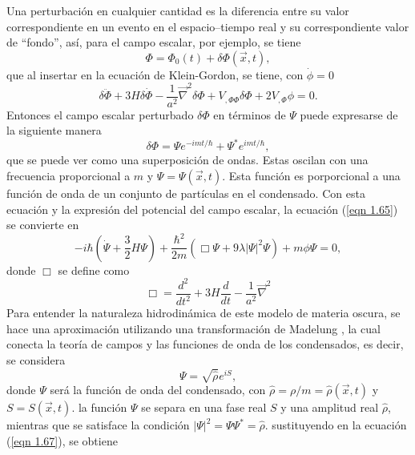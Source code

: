 \documentclass[a4paper,openright,12pt]{book}
\begin{document}
Una perturbación en cualquier cantidad es la diferencia entre su valor correspondiente en un evento en el espacio--tiempo real y su correspondiente valor de ``fondo'', así, para el campo escalar, por ejemplo, se tiene
\begin{equation}
\Phi = \Phi_{0}(t) + \delta\Phi(\vec{x},t),\label{eqn 1.64}
\end{equation}
que al insertar en la ecuación de Klein-Gordon, se tiene, con $\dot{\phi}=0$
\begin{equation}
\delta\ddot{\Phi} + 3H\delta\dot{\Phi}
- \frac{1}{a^{2}}\vec{\nabla}^{2}\delta\Phi
+V_{,\Phi\Phi}\delta\Phi +2V_{,\Phi}\phi = 0.\label{eqn 1.65}
\end{equation}
Entonces el campo escalar perturbado $\delta\Phi$ en términos de $\Psi$ puede expresarse de la siguiente manera
\begin{equation}
\delta\Phi = \Psi e^{-imt/\hbar} +\Psi^{*}e^{imt/\hbar},\label{eqn 1.66}
\end{equation}
que se puede ver como una superposición de ondas. Estas oscilan con una frecuencia proporcional a $m$ y $\Psi = \Psi(\vec{x},t)$. Esta función es porporcional a una función de onda de un conjunto de partículas en el condensado. Con esta ecuación y la expresión del potencial del campo escalar, la ecuación (\ref{eqn 1.65}) se convierte en 
\begin{equation}
-i\hbar(\dot{\Psi}+\frac{3}{2}H\Psi) + \frac{\hbar^{2}}{2m}(\Box \Psi +9\lambda|\Psi|^{2}\Psi) + m\phi\Psi = 0,\label{eqn 1.67}
\end{equation}
donde $\Box$ se define como 
\begin{equation}
\Box = \frac{d^{2}}{d t^{2}} + 3H\frac{d}{d t} - \frac{1}{a^{2}}\vec{\nabla}^{2}\label{eqn 1.68}
\end{equation}
Para entender la naturaleza hidrodinámica de este modelo de materia oscura, se hace una aproximación utilizando una transformación de Madelung \cite{3.2, 3.3, 3.4}, la cual conecta la teoría de campos y las funciones de onda de los condensados, es decir, se considera 
\begin{equation}
\Psi=\sqrt{\hat{\rho}} e^{iS},\label{eqn 1.69}
\end{equation}
donde $\Psi$ será la función de onda del condensado, con $\hat{\rho}=\rho/m=\hat{\rho}(\vec{x},t)$ y $S=S(\vec{x},t)$. la función $\Psi$ se separa en una fase real $S$ y una amplitud real $\hat{\rho}$, mientras que se satisface la condición $|\Psi|^{2}=\Psi\Psi^{*}= \hat{\rho}$. sustituyendo en la ecuación (\ref{eqn 1.67}), se obtiene
\end{document}
